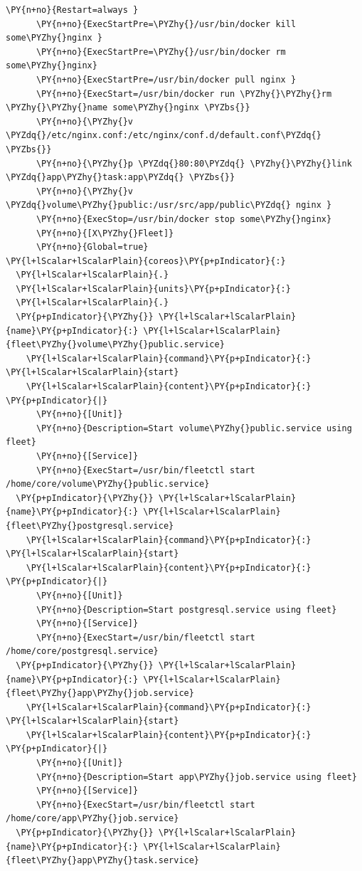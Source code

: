 \begin{codelisting}
\begin{Verbatim}[fontsize=\relsize{-2.5},fontseries=b,commandchars=\\\{\}]
      \PY{n+no}{Restart=always }
      \PY{n+no}{ExecStartPre=\PYZhy{}/usr/bin/docker kill some\PYZhy{}nginx }
      \PY{n+no}{ExecStartPre=\PYZhy{}/usr/bin/docker rm some\PYZhy{}nginx}
      \PY{n+no}{ExecStartPre=/usr/bin/docker pull nginx }
      \PY{n+no}{ExecStart=/usr/bin/docker run \PYZhy{}\PYZhy{}rm \PYZhy{}\PYZhy{}name some\PYZhy{}nginx \PYZbs{}}
      \PY{n+no}{\PYZhy{}v \PYZdq{}/etc/nginx.conf:/etc/nginx/conf.d/default.conf\PYZdq{} \PYZbs{}}
      \PY{n+no}{\PYZhy{}p \PYZdq{}80:80\PYZdq{} \PYZhy{}\PYZhy{}link \PYZdq{}app\PYZhy{}task:app\PYZdq{} \PYZbs{}}
      \PY{n+no}{\PYZhy{}v \PYZdq{}volume\PYZhy{}public:/usr/src/app/public\PYZdq{} nginx }
      \PY{n+no}{ExecStop=/usr/bin/docker stop some\PYZhy{}nginx}
      \PY{n+no}{[X\PYZhy{}Fleet]}
      \PY{n+no}{Global=true}
\PY{l+lScalar+lScalarPlain}{coreos}\PY{p+pIndicator}{:}
  \PY{l+lScalar+lScalarPlain}{.}
  \PY{l+lScalar+lScalarPlain}{units}\PY{p+pIndicator}{:}
  \PY{l+lScalar+lScalarPlain}{.}
  \PY{p+pIndicator}{\PYZhy{}} \PY{l+lScalar+lScalarPlain}{name}\PY{p+pIndicator}{:} \PY{l+lScalar+lScalarPlain}{fleet\PYZhy{}volume\PYZhy{}public.service}
    \PY{l+lScalar+lScalarPlain}{command}\PY{p+pIndicator}{:} \PY{l+lScalar+lScalarPlain}{start}
    \PY{l+lScalar+lScalarPlain}{content}\PY{p+pIndicator}{:} \PY{p+pIndicator}{|}
      \PY{n+no}{[Unit]}
      \PY{n+no}{Description=Start volume\PYZhy{}public.service using fleet}
      \PY{n+no}{[Service]}
      \PY{n+no}{ExecStart=/usr/bin/fleetctl start /home/core/volume\PYZhy{}public.service}
  \PY{p+pIndicator}{\PYZhy{}} \PY{l+lScalar+lScalarPlain}{name}\PY{p+pIndicator}{:} \PY{l+lScalar+lScalarPlain}{fleet\PYZhy{}postgresql.service}
    \PY{l+lScalar+lScalarPlain}{command}\PY{p+pIndicator}{:} \PY{l+lScalar+lScalarPlain}{start}
    \PY{l+lScalar+lScalarPlain}{content}\PY{p+pIndicator}{:} \PY{p+pIndicator}{|}
      \PY{n+no}{[Unit]}
      \PY{n+no}{Description=Start postgresql.service using fleet}
      \PY{n+no}{[Service]}
      \PY{n+no}{ExecStart=/usr/bin/fleetctl start /home/core/postgresql.service}
  \PY{p+pIndicator}{\PYZhy{}} \PY{l+lScalar+lScalarPlain}{name}\PY{p+pIndicator}{:} \PY{l+lScalar+lScalarPlain}{fleet\PYZhy{}app\PYZhy{}job.service}
    \PY{l+lScalar+lScalarPlain}{command}\PY{p+pIndicator}{:} \PY{l+lScalar+lScalarPlain}{start}
    \PY{l+lScalar+lScalarPlain}{content}\PY{p+pIndicator}{:} \PY{p+pIndicator}{|}
      \PY{n+no}{[Unit]}
      \PY{n+no}{Description=Start app\PYZhy{}job.service using fleet}
      \PY{n+no}{[Service]}
      \PY{n+no}{ExecStart=/usr/bin/fleetctl start /home/core/app\PYZhy{}job.service}
  \PY{p+pIndicator}{\PYZhy{}} \PY{l+lScalar+lScalarPlain}{name}\PY{p+pIndicator}{:} \PY{l+lScalar+lScalarPlain}{fleet\PYZhy{}app\PYZhy{}task.service}

\end{Verbatim}
\end{codelisting}

